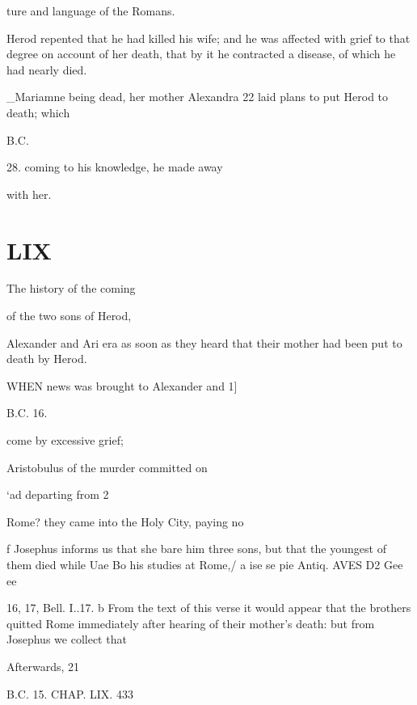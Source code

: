 ture and language of the Romans. 

Herod repented that he had killed his wife; and he was affected with grief to that degree on account of her death, that by it he contracted a disease, of which he had nearly died. 

_Mariamne being dead, her mother Alexandra 22 laid plans to put Herod to death; which 

B.C. 

28. coming to his knowledge, he made away 

with her. 

\chapter{LIX}

The history of the coming 

of the two sons of Herod, 

Alexander and Ari era as soon as they heard that their mother had been put to death by Herod. 

WHEN news was brought to Alexander and 1] 

B.C. 16. 

come by excessive grief; 

Aristobulus of the murder committed on 

‘ad departing from 2 

Rome? they came into the Holy City, paying no 

f Josephus informs us that she bare him three sons, but that the youngest of them died while Uae Bo his studies at Rome,/ 
a ise se pie Antiq. AVES D2 Gee ee 

16, 17, Bell. I..17. 
b From the text of this verse it would appear that the brothers quitted Rome immediately after hearing of their mother’s death: but from Josephus we collect that 

Afterwards, 21 

B.C. 15. CHAP. LIX. 433 

